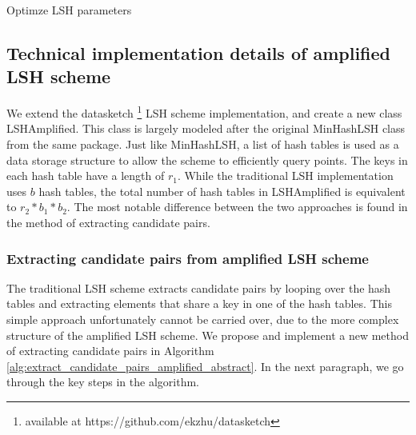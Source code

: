 \begin{algorithm}
{{{                
            }
        }
    }
    \caption{Optimze LSH parameters}
    \label{alg:optimize_lsh_paramaters}
    \end{algorithm}
    
\subsection{Technical implementation details of amplified LSH scheme}
We extend the datasketch \footnote{available at https://github.com/ekzhu/datasketch} LSH scheme implementation, and create a new class LSHAmplified. This class is largely modeled after the original MinHashLSH class from the same package. Just like MinHashLSH, a list of hash tables is used as a data storage structure to allow the scheme to efficiently query points. The keys in each hash table have a length of $r_1$. While the traditional LSH implementation uses $b$ hash tables, the total number of hash tables in LSHAmplified is equivalent to $r_2 * b_1 * b_2$. The most notable difference between the two approaches is found in the method of extracting candidate pairs.

\subsubsection{Extracting candidate pairs from amplified LSH scheme}
The traditional LSH scheme extracts candidate pairs by looping over the hash tables and extracting elements that share a key in one of the hash tables. This simple approach unfortunately cannot be carried over, due to the more complex structure of the amplified LSH scheme. We propose and implement a new method of extracting candidate pairs in Algorithm \ref{alg:extract_candidate_pairs_amplified_abstract}. In the next paragraph, we go through the key steps in the algorithm.

